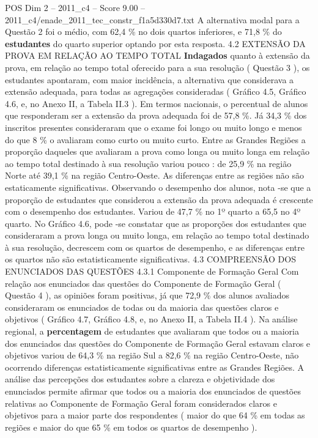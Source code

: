 \begin{textsample}{POS Dim 2 – 2011\_c4 – Score 9.00 – 2011\_c4/enade\_2011\_tec\_constr\_f1a5d330d7.txt}
A alternativa modal para a Questão 2 foi o médio, com 62,4 \% no dois quartos inferiores, e 71,8 \% do \textbf{estudantes} do quarto superior optando por esta resposta. 4.2 EXTENSÃO DA PROVA EM RELAÇÃO AO TEMPO TOTAL \textbf{Indagados} quanto à extensão da prova, em relação ao tempo total oferecido para a sua resolução ( Questão 3 ), os estudantes apontaram, com maior incidência, a alternativa que considerava a extensão adequada, para todas as agregações consideradas ( Gráfico 4.5, Gráfico 4.6, e, no Anexo II, a Tabela II.3 ).
Em termos nacionais, o percentual de alunos que responderam ser a extensão da prova adequada foi de 57,8 \%.
Já 34,3 \% dos inscritos presentes consideraram que o exame foi longo ou muito longo e menos do que 8 \% o avaliaram como curto ou muito curto.
Entre as Grandes Regiões a proporção daqueles que avaliaram a prova como longa ou muito longa em relação ao tempo total destinado à sua resolução variou pouco : de 25,9 \% na região Norte até 39,1 \% na região Centro-Oeste.
As diferenças entre as regiões não são estaticamente significativas.
Observando o desempenho dos alunos, nota -se que a proporção de estudantes que considerou a extensão da prova adequada é crescente com o desempenho dos estudantes.
Variou de 47,7 \% no 1º quarto a 65,5 no 4º quarto.
No Gráfico 4.6, pode -se constatar que as proporções dos estudantes que consideraram a prova longa ou muito longa, em relação ao tempo total destinado à sua resolução, decrescem com os quartos de desempenho, e as diferenças entre os quartos não são estatisticamente significativas. 4.3 COMPREENSÃO DOS ENUNCIADOS DAS QUESTÕES 4.3.1 Componente de Formação Geral Com relação aos enunciados das questões do Componente de Formação Geral ( Questão 4 ), as opiniões foram positivas, já que 72,9 \% dos alunos avaliados consideraram os enunciados de todas ou da maioria das questões claros e objetivos ( Gráfico 4.7, Gráfico 4.8, e, no Anexo II, a Tabela II.4 ).
Na análise regional, a \textbf{percentagem} de estudantes que avaliaram que todos ou a maioria dos enunciados das questões do Componente de Formação Geral estavam claros e objetivos variou de 64,3 \% na região Sul a 82,6 \% na região Centro-Oeste, não ocorrendo diferenças estatisticamente significativas entre as Grandes Regiões.
A análise das percepções dos estudantes sobre a clareza e objetividade dos enunciados permite afirmar que todos ou a maioria dos enunciados de questões relativas ao Componente de Formação Geral foram considerados claros e objetivos para a maior parte dos respondentes ( maior do que 64 \% em todas as regiões e maior do que 65 \% em todos os quartos de desempenho ).

\end{textsample}
